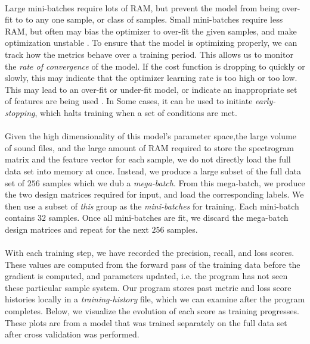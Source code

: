 \documentclass[12pt,letterpaper]{article}
\begin{document}
\paragraph*{}Large mini-batches require lots of RAM, but prevent the model from being over-fit to to any one sample, or class of samples. Small mini-batches require less RAM, but often may bias the optimizer to over-fit the given samples, and make optimization unstable \cite{Geron,James}. To ensure that the model is optimizing properly, we can track how the metrics behave over a training period. This allows us to monitor the \textit{rate of convergence} of the model. If the cost function is dropping to quickly or slowly, this may indicate that the optimizer learning rate is too high or too low. This may lead to an over-fit or under-fit model, or indicate an inappropriate set of features are being used \cite{Geron,Goodfellow}. In Some cases, it can be used to initiate \textit{early-stopping}, which halts training when a set of conditions are met. 

\paragraph*{}Given the high dimensionality of this model's parameter space,the large volume of sound files, and the large amount of RAM required to store the spectrogram matrix and the feature vector for each sample, we do not directly load the full data set into memory at once. Instead, we produce a large subset of the full data set of $256$ samples which we dub a \textit{mega-batch}. From this mega-batch, we produce the two design matrices required for input, and load the corresponding labels. We then use a subset of \textit{this} group as the \textit{mini-batches} for training. Each mini-batch contains $32$ samples. Once all mini-batches are fit, we discard the mega-batch design matrices and repeat for the next $256$ samples. 

\paragraph*{}With each training step, we have recorded the precision, recall, and loss scores. These values are computed from the forward pass of the training data before the gradient is computed, and parameters updated, i.e. the program has not seen these particular sample system. Our program stores past metric and loss score histories locally in a \textit{training-history} file, which we can examine after the program completes. Below, we visualize the evolution of each score as training progresses. These plots are from a model that was trained separately on the full data set after cross validation was performed.
\end{document}
